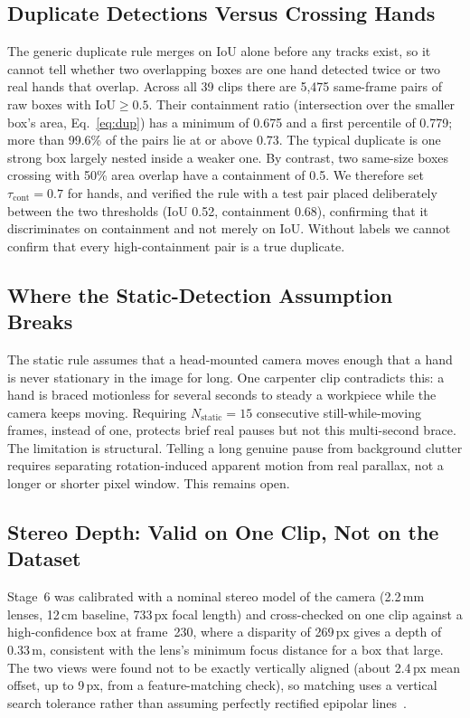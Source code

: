 \documentclass[journal]{IEEEtran}
\begin{document}
\subsection{Duplicate Detections Versus Crossing Hands}
\label{sec:crossing}
The generic duplicate rule merges on IoU alone before any tracks exist, so it cannot tell whether two overlapping boxes are one hand detected twice or two real hands that overlap. Across all 39 clips there are 5,475 same-frame pairs of raw boxes with $\mathrm{IoU}\ge0.5$. Their containment ratio (intersection over the smaller box's area, Eq.~\eqref{eq:dup}) has a minimum of 0.675 and a first percentile of 0.779; more than 99.6\% of the pairs lie at or above 0.73. The typical duplicate is one strong box largely nested inside a weaker one. By contrast, two same-size boxes crossing with 50\% area overlap have a containment of 0.5. We therefore set $\tau_{\mathrm{cont}}=0.7$ for hands, and verified the rule with a test pair placed deliberately between the two thresholds (IoU 0.52, containment 0.68), confirming that it discriminates on containment and not merely on IoU. Without labels we cannot confirm that every high-containment pair is a true duplicate.

\subsection{Where the Static-Detection Assumption Breaks}
\label{sec:static}
The static rule assumes that a head-mounted camera moves enough that a hand is never stationary in the image for long. One carpenter clip contradicts this: a hand is braced motionless for several seconds to steady a workpiece while the camera keeps moving. Requiring $N_{\mathrm{static}}=15$ consecutive still-while-moving frames, instead of one, protects brief real pauses but not this multi-second brace. The limitation is structural. Telling a long genuine pause from background clutter requires separating rotation-induced apparent motion from real parallax, not a longer or shorter pixel window. This remains open.

\subsection{Stereo Depth: Valid on One Clip, Not on the Dataset}
\label{sec:stereo}
Stage~6 was calibrated with a nominal stereo model of the camera (2.2\,mm lenses, 12\,cm baseline, 733\,px focal length) and cross-checked on one clip against a high-confidence box at frame~230, where a disparity of 269\,px gives a depth of 0.33\,m, consistent with the lens's minimum focus distance for a box that large. The two views were found not to be exactly vertically aligned (about 2.4\,px mean offset, up to 9\,px, from a feature-matching check), so matching uses a vertical search tolerance rather than assuming perfectly rectified epipolar lines~\cite{fusiello2000rectification}.
\end{document}

